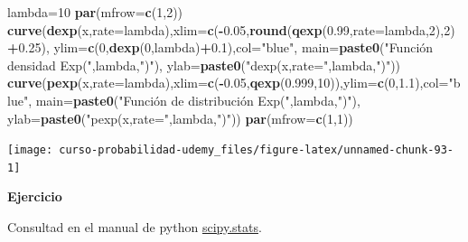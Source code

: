 \documentclass[]{book}
\newenvironment{Shaded}{\begin{snugshade}}{\end{snugshade}}
\newcommand{\DataTypeTok}[1]{\textcolor[rgb]{0.13,0.29,0.53}{#1}}
\newcommand{\DecValTok}[1]{\textcolor[rgb]{0.00,0.00,0.81}{#1}}
\newcommand{\FloatTok}[1]{\textcolor[rgb]{0.00,0.00,0.81}{#1}}
\newcommand{\KeywordTok}[1]{\textcolor[rgb]{0.13,0.29,0.53}{\textbf{#1}}}
\newcommand{\NormalTok}[1]{#1}
\newcommand{\OperatorTok}[1]{\textcolor[rgb]{0.81,0.36,0.00}{\textbf{#1}}}
\newcommand{\StringTok}[1]{\textcolor[rgb]{0.31,0.60,0.02}{#1}}
\begin{document}
\begin{Shaded}
\begin{Highlighting}[]
\NormalTok{lambda=}\DecValTok{10}
\KeywordTok{par}\NormalTok{(}\DataTypeTok{mfrow=}\KeywordTok{c}\NormalTok{(}\DecValTok{1}\NormalTok{,}\DecValTok{2}\NormalTok{))}
\KeywordTok{curve}\NormalTok{(}\KeywordTok{dexp}\NormalTok{(x,}\DataTypeTok{rate=}\NormalTok{lambda),}\DataTypeTok{xlim=}\KeywordTok{c}\NormalTok{(}\OperatorTok{-}\FloatTok{0.05}\NormalTok{,}\KeywordTok{round}\NormalTok{(}\KeywordTok{qexp}\NormalTok{(}\FloatTok{0.99}\NormalTok{,}\DataTypeTok{rate=}\NormalTok{lambda,}\DecValTok{2}\NormalTok{),}\DecValTok{2}\NormalTok{)}\OperatorTok{+}\FloatTok{0.25}\NormalTok{),}
      \DataTypeTok{ylim=}\KeywordTok{c}\NormalTok{(}\DecValTok{0}\NormalTok{,}\KeywordTok{dexp}\NormalTok{(}\DecValTok{0}\NormalTok{,lambda)}\OperatorTok{+}\FloatTok{0.1}\NormalTok{),}\DataTypeTok{col=}\StringTok{"blue"}\NormalTok{,}
      \DataTypeTok{main=}\KeywordTok{paste0}\NormalTok{(}\StringTok{"Función densidad Exp("}\NormalTok{,lambda,}\StringTok{")"}\NormalTok{),}
      \DataTypeTok{ylab=}\KeywordTok{paste0}\NormalTok{(}\StringTok{"dexp(x,rate="}\NormalTok{,lambda,}\StringTok{")"}\NormalTok{))}
\KeywordTok{curve}\NormalTok{(}\KeywordTok{pexp}\NormalTok{(x,}\DataTypeTok{rate=}\NormalTok{lambda),}\DataTypeTok{xlim=}\KeywordTok{c}\NormalTok{(}\OperatorTok{-}\FloatTok{0.05}\NormalTok{,}\KeywordTok{qexp}\NormalTok{(}\FloatTok{0.999}\NormalTok{,}\DecValTok{10}\NormalTok{)),}\DataTypeTok{ylim=}\KeywordTok{c}\NormalTok{(}\DecValTok{0}\NormalTok{,}\FloatTok{1.1}\NormalTok{),}\DataTypeTok{col=}\StringTok{"blue"}\NormalTok{,}
      \DataTypeTok{main=}\KeywordTok{paste0}\NormalTok{(}\StringTok{"Función de distribución Exp("}\NormalTok{,lambda,}\StringTok{")"}\NormalTok{),}
      \DataTypeTok{ylab=}\KeywordTok{paste0}\NormalTok{(}\StringTok{"pexp(x,rate="}\NormalTok{,lambda,}\StringTok{")"}\NormalTok{))}
\KeywordTok{par}\NormalTok{(}\DataTypeTok{mfrow=}\KeywordTok{c}\NormalTok{(}\DecValTok{1}\NormalTok{,}\DecValTok{1}\NormalTok{))}
\end{Highlighting}
\end{Shaded}

\begin{center}\texttt{[image: curso-probabilidad-udemy\_files/figure-latex/unnamed-chunk-93-1]} \end{center}

\textbf{Ejercicio}

Consultad en el manual de python \href{https://docs.scipy.org/doc/scipy/reference/generated/scipy.stats.expon.html}{scipy.stats}.
\end{document}
